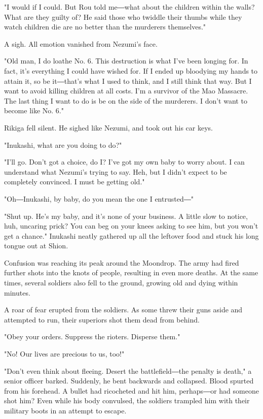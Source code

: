 "I would if I could. But Rou told me―what about the children within the
walls? What are they guilty of? He said those who twiddle their thumbs
while they watch children die are no better than the murderers
themselves."

A sigh. All emotion vanished from Nezumi's face.

"Old man, I do loathe No. 6. This destruction is what I've been longing
for. In fact, it's everything I could have wished for. If I ended up
bloodying my hands to attain it, so be it―that's what I used to think,
and I still think that way. But I want to avoid killing children at all
costs. I'm a survivor of the Mao Massacre. The last thing I want to do
is be on the side of the murderers. I don't want to become like No. 6."

Rikiga fell silent. He sighed like Nezumi, and took out his car keys.

"Inukashi, what are you doing to do?"

"I'll go. Don't got a choice, do I? I've got my own baby to worry about.
I can understand what Nezumi's trying to say. Heh, but I didn't expect
to be completely convinced. I must be getting old."

"Oh―Inukashi, by baby, do you mean the one I entrusted―"

"Shut up. He's my baby, and it's none of your business. A little slow to
notice, huh, uncaring prick? You can beg on your knees asking to see
him, but you won't get a chance." Inukashi neatly gathered up all the
leftover food and stuck his long tongue out at Shion.

\myspace

Confusion was reaching its peak around the Moondrop. The army had fired
further shots into the knots of people, resulting in even more deaths.
At the same times, several soldiers also fell to the ground, growing old
and dying within minutes.

A roar of fear erupted from the soldiers. As some threw their guns aside
and attempted to run, their superiors shot them dead from behind.

"Obey your orders. Suppress the rioters. Disperse them."

"No! Our lives are precious to us, too!"

"Don't even think about fleeing. Desert the battlefield―the penalty is
death," a senior officer barked. Suddenly, he bent backwards and
collapsed. Blood spurted from his forehead. A bullet had ricocheted and
hit him, perhaps―or had someone shot him? Even while his body convulsed,
the soldiers trampled him with their military boots in an attempt to
escape.

